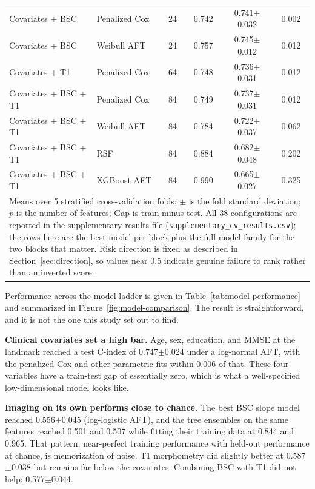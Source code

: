 \documentclass[blue]{ludusofficial}  %
\begin{document}
\begin{table}[!htbp]
\begin{tabular}{llcccc}
\hline
Covariates + BSC & Penalized Cox & 24 & 0.742 & 0.741$\pm$0.032 & 0.002 \\
Covariates + BSC & Weibull AFT & 24 & 0.757 & 0.745$\pm$0.012 & 0.012 \\
Covariates + T1 & Penalized Cox & 64 & 0.748 & 0.736$\pm$0.031 & 0.012 \\
Covariates + BSC + T1 & Penalized Cox & 84 & 0.749 & 0.737$\pm$0.031 & 0.012 \\
Covariates + BSC + T1 & Weibull AFT & 84 & 0.784 & 0.722$\pm$0.037 & 0.062 \\
Covariates + BSC + T1 & RSF & 84 & 0.884 & 0.682$\pm$0.048 & 0.202 \\
Covariates + BSC + T1 & XGBoost AFT & 84 & 0.990 & 0.665$\pm$0.027 & 0.325 \\
\hline
\multicolumn{6}{p{0.92\textwidth}}{\footnotesize Means over 5 stratified cross-validation folds; $\pm$ is the fold standard deviation; $p$ is the number of features; Gap is train minus test. All 38 configurations are reported in the supplementary results file (\texttt{supplementary\_cv\_results.csv}); the rows here are the best model per block plus the full model family for the two blocks that matter. Risk direction is fixed as described in Section~\ref{sec:direction}, so values near 0.5 indicate genuine failure to rank rather than an inverted score.} \\
\end{tabular}
\end{table}

Performance across the model ladder is given in Table~\ref{tab:model-performance} and summarized in Figure~\ref{fig:model-comparison}. The result is straightforward, and it is not the one this study set out to find.

\textbf{Clinical covariates set a high bar.} Age, sex, education, and MMSE at the landmark reached a test C-index of 0.747$\pm$0.024 under a log-normal AFT, with the penalized Cox and other parametric fits within 0.006 of that. These four variables have a train-test gap of essentially zero, which is what a well-specified low-dimensional model looks like.

\textbf{Imaging on its own performs close to chance.} The best BSC slope model reached 0.556$\pm$0.045 (log-logistic AFT), and the tree ensembles on the same features reached 0.501 and 0.507 while fitting their training data at 0.844 and 0.965. That pattern, near-perfect training performance with held-out performance at chance, is memorization of noise. T1 morphometry did slightly better at 0.587$\pm$0.038 but remains far below the covariates. Combining BSC with T1 did not help: 0.577$\pm$0.044.
\end{document}
